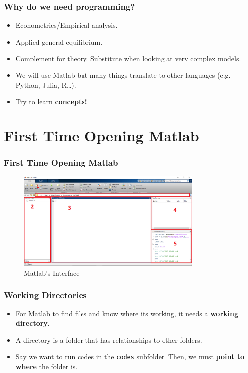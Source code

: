 \documentclass[11pt,xcolor={svgnames},aspectratio=169,usepdftitle=false,notheorems]{beamer}
\begin{document}
\begin{frame}[c]
  \frametitle{Why do we need programming?}
  
  \begin{itemize}
    \item Econometrics/Empirical analysis.
    \item Applied general equilibrium.
    \item Complement for theory. Substitute when looking at very complex models.
    \item We will use Matlab but many things translate to other languages (e.g. Python, Julia, R\ldots).
    \item Try to learn \alert{\textbf{concepts!}} 
  \end{itemize}

\end{frame}

\section{First Time Opening Matlab}

\begin{frame}
    \frametitle{First Time Opening Matlab}
\begin{figure}
    \centering
    \includegraphics[width = 0.8\textwidth]{../figures/matlab_initial.PNG}
    \caption{Matlab's Interface}
    \label{fig:matlab_interface}
\end{figure}
\end{frame}

\begin{frame}[fragile]
    \frametitle{Working Directories}
\begin{itemize}
    \item For Matlab to find files and know where its working, it needs a \alert{\textbf{working directory}}.
    \item A directory is a folder that has relationships to other folders.
\end{itemize}
\begin{itemize}
    \item Say we want to run codes in the \verb;codes; subfolder. Then, we must \alert{\textbf{point to where}} the folder is.
\end{itemize}
\end{frame}
\end{document}
